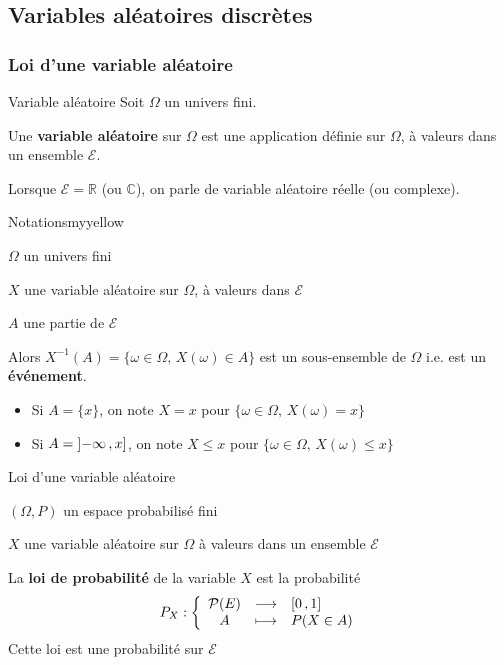 \subsection{Variables aléatoires discrètes}

    \subsubsection{Loi d’une variable aléatoire}

    \begin{defi}{Variable aléatoire}{}
        Soit $\Omega$ un univers fini.
    
        Une \textbf{variable aléatoire} sur $\Omega$ est une application définie sur $\Omega$, à valeurs dans un ensemble $\mathcal{E}$.

        Lorsque $\mathcal{E} = \mathbb{R}$ (ou $\mathbb{C}$), on parle de variable aléatoire réelle (ou complexe).
    \end{defi}

    \begin{omed}{Notations}{myyellow}
        \begin{soient}
            \item $\Omega$ un univers fini
            \item $X$ une variable aléatoire sur $\Omega$, à valeurs dans $\mathcal{E}$
            \item $A$ une partie de $\mathcal{E}$
        \end{soient}
        Alors $X^{-1}(A) = \{ \omega \in \Omega, \, X(\omega) \in A \}$ est un sous-ensemble de $\Omega$ i.e. est un \textbf{événement}.
        \begin{itemize}
            \item Si $A = \{ x \}$, on note $X = x$ pour $ \{ \omega \in \Omega, \, X(\omega) = x \}$
            \item Si $A = \left] -\infty \, , x \right]$, on note $X \leq x$ pour $\{ \omega \in \Omega, \, X(\omega) \leq x \}$
        \end{itemize}
    \end{omed}

    \begin{defi}{Loi d’une variable aléatoire}{}
        \begin{soient}
            \item $(\Omega,P)$ un espace probabilisé fini
            \item $X$ une variable aléatoire sur $\Omega$ à valeurs dans un ensemble $\mathcal{E}$
        \end{soient}
        La \textbf{loi de probabilité} de la variable $X$ est la probabilité 
        \[ \fonction{P_X}{\mathcal{P}(E)}{\intervalleFF{0}{1}}{A}{P(X \in A)} \]
        Cette loi est une probabilité sur $\mathcal{E}$
    \end{defi}

